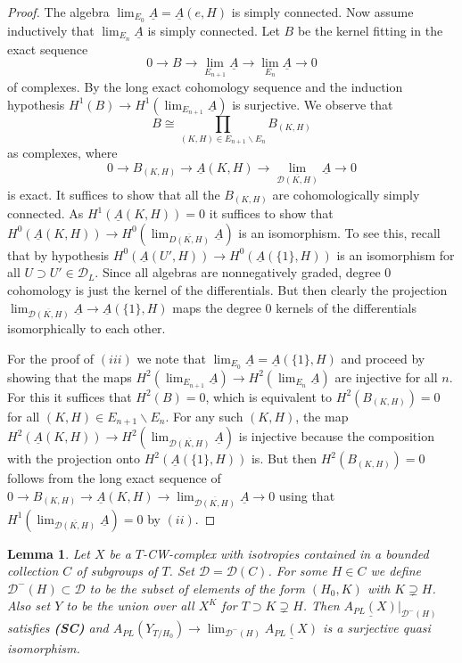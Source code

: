 \documentclass[12pt,a4paper]{article}
\newtheorem{lem}[thm]{Lemma}
\theoremstyle{definition}
\begin{document}
\begin{proof}
The algebra $\lim_{E_0}\underline{A}=\underline{A}(e,H)$ is simply connected. Now assume inductively that $\lim_{E_n}\underline{A}$ is simply connected. Let $B$ be the kernel fitting in the exact sequence 
\[0\longrightarrow B\longrightarrow \lim_{E_{n+1}}\underline{A}\longrightarrow \lim_{E_n}\underline{A}\longrightarrow 0\]
of complexes. By the long exact cohomology sequence and the induction hypothesis $H^1(B)\rightarrow H^1(\lim_{E_{n+1}}\underline{A})$ is surjective. We observe that 
\[B\cong \prod_{(K,H)\in E_{n+1}\backslash E_n} B_{(K,H)}\]
as complexes, where
\[0\longrightarrow B_{(K,H)}\longrightarrow \underline{A}(K,H)\longrightarrow \lim_{\overline{\mathcal{D}(K,H)}}\underline{A}\longrightarrow 0\]
is exact. It suffices to show that all the $B_{(K,H)}$ are cohomologically simply connected. As $H^1(\underline{A}(K,H))=0$ it suffices to show that $H^0(\underline{A}(K,H))\rightarrow H^0(\lim_{\overline{D(K,H)}}\underline{A})$ is an isomorphism.
To see this, recall that by hypothesis $H^0(\underline{A}(U',H))\rightarrow H^0(\underline{A}(\{1\},H))$ is an isomorphism for all $U\supset U'\in\mathcal{D}_L$. Since all algebras are nonnegatively graded, degree $0$ cohomology is just the kernel of the differentials. But then clearly the projection $\lim_{\overline{\mathcal{D}(K,H)}}\underline{A}\rightarrow \underline{A}(\{1\},H)$ maps the degree $0$ kernels of the differentials isomorphically to each other.

For the proof of $(iii)$ we note that $\lim_{E_0}\underline{A}=\underline{A}(\{1\},H)$ and proceed by showing that the maps $H^2(\lim_{E_{n+1}}\underline{A})\rightarrow H^2(\lim_{E_n}\underline{A})$ are injective for all $n$. For this it suffices that $H^2(B)=0$, which is equivalent to $H^2(B_{(K,H)})=0$ for all $(K,H)\in E_{n+1}\backslash E_n$. For any such $(K,H)$, the map $H^2(\underline{A}(K,H))\rightarrow H^2(\lim_{\overline{\mathcal{D}(K,H)}}\underline{A})$ is injective because the composition with the projection onto $H^2(\underline{A}(\{1\},H))$ is. But then $H^2(B_{(K,H)})=0$ follows from the long exact sequence of $0\longrightarrow B_{(K,H)}\longrightarrow \underline{A}(K,H)\longrightarrow \lim_{\overline{\mathcal{D}(K,H)}}\underline{A}\longrightarrow 0$ using that $H^1(\lim_{\overline{\mathcal{D}(K,H)}}\underline{A})=0$ by $(ii)$.
\end{proof}

\begin{lem}\label{lem:subcomplexes}
Let $X$ be a $T$-CW-complex with isotropies contained in a bounded collection $C$ of subgroups of $T$. Set $\mathcal{D}=\mathcal{D}(C)$. For some $H\in C$ we define $\mathcal{D}^-(H)\subset \mathcal{D}$ to be the subset of elements of the form $(H_0,K)$ with $K\supsetneq H$. Also set $Y$ to be the union over all $X^K$ for $T\supset K\supsetneq H$. Then $\underline{A_{PL}(X)}|_{\mathcal{D}^-(H)}$ satisfies \textbf{(SC)} and $A_{PL}(Y_{T/H_0})\rightarrow \lim_{\mathcal{D}^-(H)} \underline{A_{PL}(X)}$ is a surjective quasi isomorphism.
\end{lem}
\end{document}
